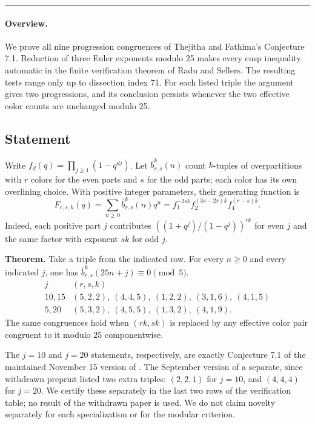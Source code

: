 \documentclass[11pt,a4paper]{article}
\begin{document}
\smallskip\hrule\medskip



\begingroup
\newcommand{\Fp}{\mathbb F_5}
\newcommand{\bb}{\bar b}
\setcounter{equation}{0}
\renewcommand{\theequation}{\thesection.\arabic{equation}}
\renewcommand{\theHequation}{R21H.\arabic{equation}}
\paragraph{Overview.}
We prove all nine progression congruences of Thejitha and Fathima's Conjecture 7.1. Reduction of three Euler exponents modulo 25 makes every cusp inequality automatic in the finite verification theorem of Radu and Sellers. The resulting tests range only up to dissection index 71. For each listed triple the argument gives two progressions, and its conclusion persists whenever the two effective color counts are unchanged modulo 25.


\subsection{Statement}
Write $f_d(q)=\prod_{j\ge1}(1-q^{dj})$. Let $\bb^k_{r,s}(n)$ count $k$-tuples of overpartitions with $r$ colors for the even parts and $s$ for the odd parts; each color has its own overlining choice. With positive integer parameters, their generating function is
\[
 F_{r,s,k}(q)=\sum_{n\ge0}\bb^k_{r,s}(n)q^n
 =f_1^{-2sk}f_2^{(3s-2r)k}f_4^{(r-s)k}.
\]
Indeed, each positive part $j$ contributes $((1+q^j)/(1-q^j))^{rk}$ for even $j$ and the same factor with exponent $sk$ for odd $j$.
\medskip

\noindent\textbf{Theorem.} Take a triple from the indicated row. For every $n\ge0$ and every indicated $j$, one has $\bb^k_{r,s}(25n+j)\equiv0\pmod5$.
\[
\begin{array}{cl}
j & (r,s,k)\\ \hline
10,15 &(5,2,2),\ (4,4,5),\ (1,2,2),\ (3,1,6),\ (4,1,5)\\
5,20 &(5,3,2),\ (4,5,5),\ (1,3,2),\ (4,1,9).
\end{array}
\]
The same congruences hold when $(rk,sk)$ is replaced by any effective color pair congruent to it modulo $25$ componentwise.

The $j=10$ and $j=20$ statements, respectively, are exactly Conjecture 7.1 of the maintained November 15 version of \cite{R21H:TF}. The September version of a separate, since withdrawn preprint \cite{R21H:TFold} listed two extra triples: $(2,2,1)$ for $j=10$, and $(4,4,4)$ for $j=20$. We certify these separately in the last two rows of the verification table; no result of the withdrawn paper is used. We do not claim novelty separately for each specialization or for the modular criterion.
\end{document}
